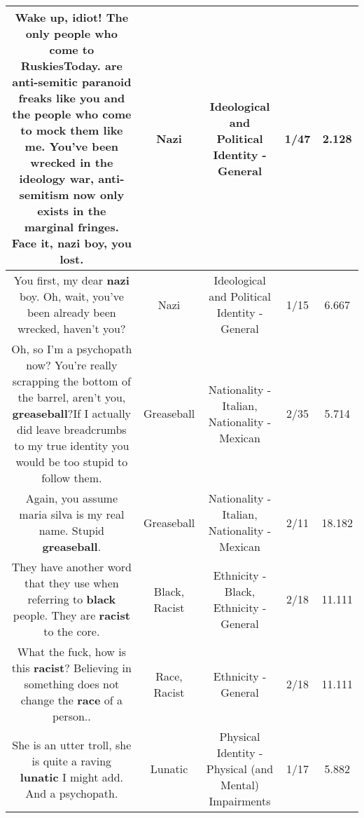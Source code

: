 \documentclass[11pt]{article}
\newlength\mylength
\begin{document}
\begin{center}
\begin{longtable}{|C{.65\mylength}|C{.30\mylength}|C{.12\mylength}|C{.12\mylength}|C{.12\mylength}|}
  \small Wake up, idiot! The only people who come to RuskiesToday. are anti-semitic paranoid freaks like you and the people who come to mock them like me. You've been wrecked in the ideology war, anti-semitism now only exists in the marginal fringes. Face it, \textbf{nazi} boy, you lost.\normalsize   & Nazi &  Ideological and Political Identity - General & 1/47 & 2.128 \\  \hline
  \small You first, my dear \textbf{nazi} boy. Oh, wait, you've been already been wrecked, haven't you?\normalsize   & Nazi &  Ideological and Political Identity - General & 1/15 & 6.667 \\  \hline
  \small Oh, so I'm a psychopath now? You're really scrapping the bottom of the barrel, aren't you, \textbf{g\textbf{reaseball}}?If I actually did leave breadcrumbs to my true identity you would be too stupid to follow them.\normalsize   & Greaseball & Nationality - Italian, Nationality - Mexican & 2/35 & 5.714 \\  \hline
  \small Again, you assume maria silva is my real name. Stupid \textbf{g\textbf{reaseball}}.\normalsize   & Greaseball & Nationality - Italian, Nationality - Mexican & 2/11 & 18.182 \\  \hline
  \small They have another word that they use when referring to \textbf{black} people. They are \textbf{racist} to the core.\normalsize   & Black, Racist & Ethnicity - Black, Ethnicity - General & 2/18 & 11.111 \\  \hline
  \small What the fuck, how is this \textbf{racist}? Believing in something does not change the \textbf{race} of a person..\normalsize   & Race, Racist & Ethnicity - General & 2/18 & 11.111 \\  \hline
  \small She is an utter troll, she is quite a raving \textbf{lunatic} I might add. And a psychopath.\normalsize   & Lunatic & Physical Identity - Physical (and Mental) Impairments & 1/17 & 5.882 \\  \hline

\end{longtable}
\end{center}
\end{document}
